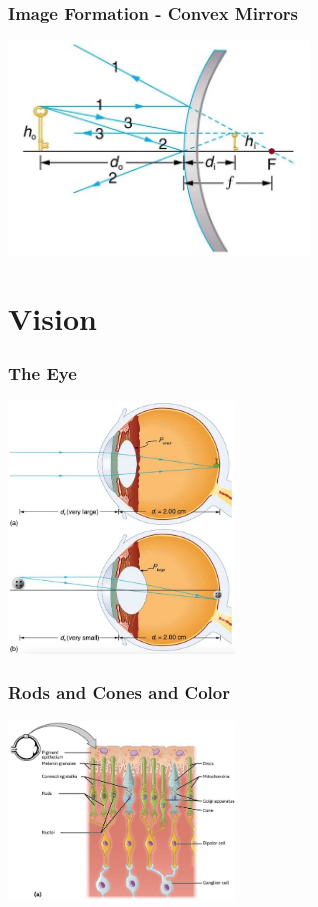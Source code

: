\documentclass{beamer}
\begin{document}
\begin{frame}\frametitle{Image Formation - Convex Mirrors}

\begin{center}
\includegraphics[width=8cm]{fig/mirrorimage6.jpg}
\end{center}

\end{frame}

\section{Vision}

\begin{frame}\frametitle{The Eye}

\begin{center}
\includegraphics[width=6cm]{fig/theI.jpg}
\end{center}

\end{frame}

\begin{frame}\frametitle{Rods and Cones and Color}

\begin{center}
\includegraphics[width=6cm]{fig/rodscones.jpg}
\end{center}

\end{frame}
\end{document}

